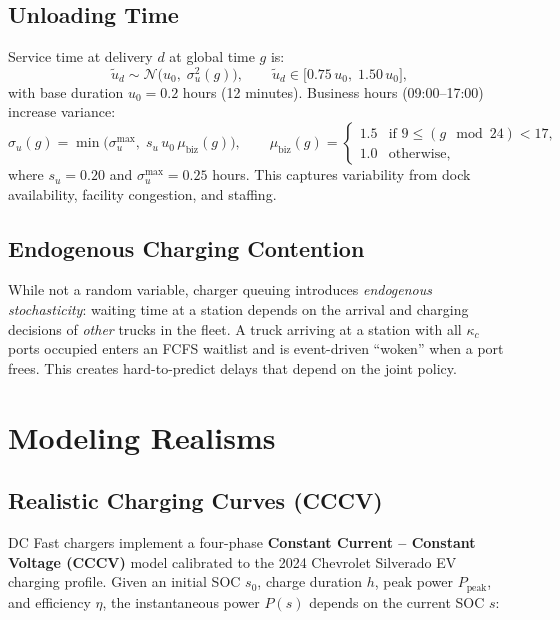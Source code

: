 \documentclass[11pt]{article}
\begin{document}
\subsection{Unloading Time}

Service time at delivery $d$ at global time $g$ is:
\[
\tilde{u}_d \sim \mathcal{N}\!\Big(u_0,\;\sigma_u^2(g)\Big), \qquad \tilde{u}_d \in \big[0.75\,u_0,\; 1.50\,u_0\big],
\]
with base duration $u_0=0.2$ hours (12 minutes). Business hours (09:00--17:00) increase variance:
\[
\sigma_u(g) = \min\!\big(\sigma_u^{\max},\; s_u\,u_0\,\mu_{\text{biz}}(g)\big), \qquad \mu_{\text{biz}}(g) = \begin{cases} 1.5 & \text{if } 9\le(g\!\!\mod 24)<17,\\ 1.0 & \text{otherwise},\end{cases}
\]
where $s_u=0.20$ and $\sigma_u^{\max}=0.25$ hours. This captures variability from dock availability, facility congestion, and staffing.

\subsection{Endogenous Charging Contention}\label{sec:queuing}

While not a random variable, charger queuing introduces \emph{endogenous stochasticity}: waiting time at a station depends on the arrival and charging decisions of \emph{other} trucks in the fleet. A truck arriving at a station with all $\kappa_c$ ports occupied enters an FCFS waitlist and is event-driven ``woken'' when a port frees. This creates hard-to-predict delays that depend on the joint policy.

\section{Modeling Realisms}\label{sec:realisms}

\subsection{Realistic Charging Curves (CCCV)}\label{sec:charging-curve}

DC Fast chargers implement a four-phase \textbf{Constant Current -- Constant Voltage (CCCV)} model calibrated to the 2024 Chevrolet Silverado EV charging profile. Given an initial SOC $s_0$, charge duration $h$, peak power $P_{\text{peak}}$, and efficiency $\eta$, the instantaneous power $P(s)$ depends on the current SOC $s$:
\end{document}
